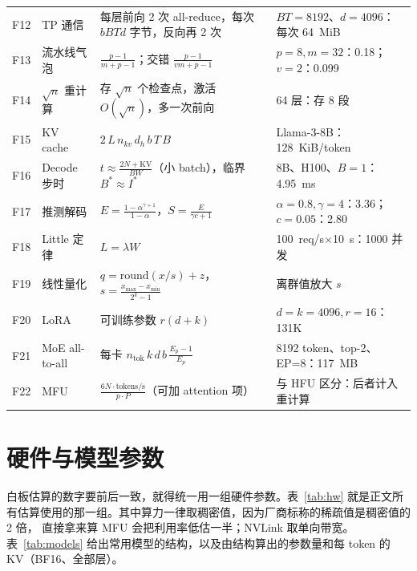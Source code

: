 \begin{table}[!t]
\begin{tabularx}{\textwidth}{@{}l L{3.2cm} L{6.6cm} Y@{}}
F12 & TP 通信 & 每层前向 2 次 all-reduce，每次 $bBTd$ 字节，反向再 2 次 & $B T=8192$、$d=4096$：每次 64~MiB \\
F13 & 流水线气泡 & $\frac{p-1}{m+p-1}$；交错 $\frac{p-1}{vm+p-1}$ & $p=8,m=32$：0.18；$v=2$：0.099 \\
F14 & $\sqrt{n}$ 重计算 & 存 $\sqrt{n}$ 个检查点，激活 $O(\sqrt{n})$，多一次前向 & 64 层：存 8 段 \\
F15 & KV cache & $2\,L\,n_{kv}\,d_h\,b\,T\,B$ & Llama-3-8B：128~KiB/token \\
F16 & Decode 步时 & $t\approx\frac{2N+\text{KV}}{BW}$（小 batch），临界 $B^\ast\approx I^\ast$ & 8B、H100、$B=1$：4.95~ms \\
F17 & 推测解码 & $E=\frac{1-\alpha^{\gamma+1}}{1-\alpha}$，$S=\frac{E}{\gamma c+1}$ & $\alpha=0.8,\gamma=4$：3.36；$c=0.05$：2.80 \\
F18 & Little 定律 & $L=\lambda W$ & 100~req/s$\times$10~s：1000 并发 \\
F19 & 线性量化 & $q=\mathrm{round}(x/s)+z$，$s=\frac{x_{\max}-x_{\min}}{2^k-1}$ & 离群值放大 $s$ \\
F20 & LoRA & 可训练参数 $r(d+k)$ & $d=k=4096,r=16$：131K \\
F21 & MoE all-to-all & 每卡 $n_{\text{tok}}\,k\,d\,b\,\frac{E_p-1}{E_p}$ & 8192 token、top-2、EP=8：117~MB \\
F22 & MFU & $\frac{6N\cdot\text{tokens/s}}{p\cdot P}$（可加 attention 项） & 与 HFU 区分：后者计入重计算 \\
\bottomrule
\end{tabularx}
\end{table}

\section{硬件与模型参数}
\label{app:hw}

白板估算的数字要前后一致，就得统一用一组硬件参数。表~\ref{tab:hw} 就是正文所有估算使用的那一组。其中算力一律取稠密值，因为厂商标称的稀疏值是稠密值的 2 倍，
直接拿来算 MFU 会把利用率低估一半；NVLink 取单向带宽。表~\ref{tab:models} 给出常用模型的结构，以及由结构算出的参数量和每 token 的 KV（BF16、全部层）。

